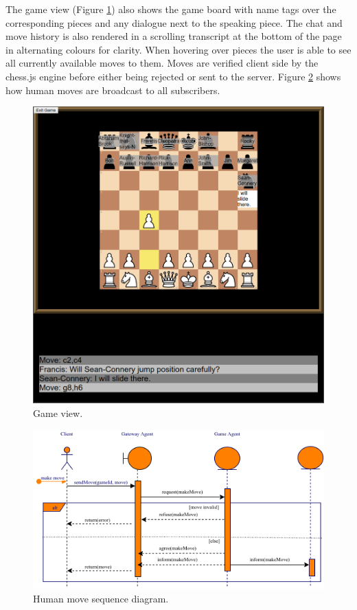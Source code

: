 \documentclass{article}
\begin{document}
The game view (Figure \ref{fig:gameview}) also shows the game board with name tags over the corresponding pieces and any dialogue next to the speaking piece. The chat and move history is also rendered in a scrolling transcript at the bottom of the page in alternating colours for clarity. When hovering over pieces the user is able to see all currently available moves to them. Moves are verified client side by the chess.js \cite{chessjs} engine before either being rejected or sent to the server. Figure \ref{fig:humanmove} shows how human moves are broadcast to all subscribers.

\begin{figure}[!h]
	\centering
	\includegraphics[width=0.8\linewidth]{images/gameview}
	\caption{Game view.}
	\label{fig:gameview}
\end{figure}

\begin{figure}[!h]
	\centering
	\includegraphics[width=\linewidth]{images/humanmove}
	\caption{Human move sequence diagram.}
	\label{fig:humanmove}
\end{figure}
\end{document}
